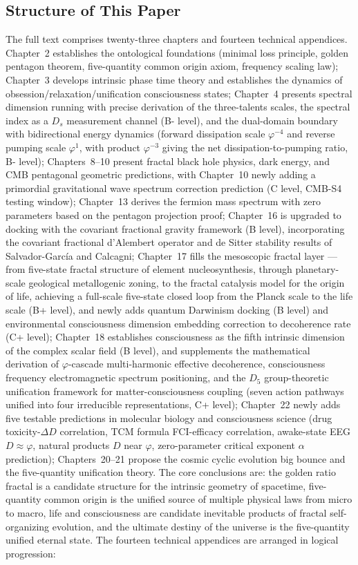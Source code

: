 \documentclass[12pt,a4paper,twocolumn]{article}
\renewcommand{\phi}{\varphi}
\begin{document}
\subsection{Structure of This Paper}
The full text comprises twenty-three chapters and fourteen technical appendices. Chapter~2 establishes the ontological foundations (minimal loss principle, golden pentagon theorem, five-quantity common origin axiom, frequency scaling law); Chapter~3 develops intrinsic phase time theory and establishes the dynamics of obsession/relaxation/unification consciousness states; Chapter~4 presents spectral dimension running with precise derivation of the three-talents scales, the spectral index as a $D_s$ measurement channel (B- level), and the dual-domain boundary with bidirectional energy dynamics (forward dissipation scale $\phi^{-4}$ and reverse pumping scale $\phi^{1}$, with product $\phi^{-3}$ giving the net dissipation-to-pumping ratio, B- level); Chapters~8--10 present fractal black hole physics, dark energy, and CMB pentagonal geometric predictions, with Chapter~10 newly adding a primordial gravitational wave spectrum correction prediction (C level, CMB-S4 testing window); Chapter~13 derives the fermion mass spectrum with zero parameters based on the pentagon projection proof; Chapter~16 is upgraded to docking with the covariant fractional gravity framework (B level), incorporating the covariant fractional d'Alembert operator and de Sitter stability results of Salvador-Garc\'ia and Calcagni; Chapter~17 fills the mesoscopic fractal layer --- from five-state fractal structure of element nucleosynthesis, through planetary-scale geological metallogenic zoning, to the fractal catalysis model for the origin of life, achieving a full-scale five-state closed loop from the Planck scale to the life scale (B+ level), and newly adds quantum Darwinism docking (B level) and environmental consciousness dimension embedding correction to decoherence rate (C+ level); Chapter~18 establishes consciousness as the fifth intrinsic dimension of the complex scalar field (B level), and supplements the mathematical derivation of $\phi$-cascade multi-harmonic effective decoherence, consciousness frequency electromagnetic spectrum positioning, and the $D_5$ group-theoretic unification framework for matter-consciousness coupling (seven action pathways unified into four irreducible representations, C+ level); Chapter~22 newly adds five testable predictions in molecular biology and consciousness science (drug toxicity-$\Delta D$ correlation, TCM formula FCI-efficacy correlation, awake-state EEG $D\approx\phi$, natural products $D$ near $\phi$, zero-parameter critical exponent $\alpha$ prediction); Chapters~20--21 propose the cosmic cyclic evolution big bounce and the five-quantity unification theory. The core conclusions are: the golden ratio fractal is a candidate structure for the intrinsic geometry of spacetime, five-quantity common origin is the unified source of multiple physical laws from micro to macro, life and consciousness are candidate inevitable products of fractal self-organizing evolution, and the ultimate destiny of the universe is the five-quantity unified eternal state. The fourteen technical appendices are arranged in logical progression: 
\end{document}
